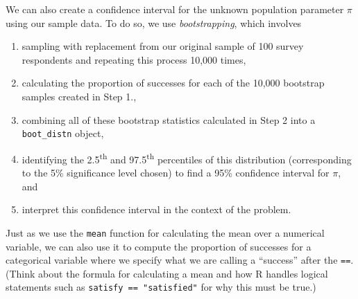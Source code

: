 \documentclass[12pt,]{krantz}
\makeatletter
\newenvironment{Shaded}{\begin{snugshade}}{\end{snugshade}}
\newcommand{\KeywordTok}[1]{\textcolor[rgb]{0.27,0.27,0.27}{\textbf{#1}}}
\newcommand{\DataTypeTok}[1]{\textcolor[rgb]{0.27,0.27,0.27}{#1}}
\newcommand{\DecValTok}[1]{\textcolor[rgb]{0.06,0.06,0.06}{#1}}
\newcommand{\StringTok}[1]{\textcolor[rgb]{0.5,0.5,0.5}{#1}}
\newcommand{\OperatorTok}[1]{\textcolor[rgb]{0.43,0.43,0.43}{\textbf{#1}}}
\newcommand{\NormalTok}[1]{#1}
\providecommand{\tightlist}{%
  \setlength{\itemsep}{0pt}\setlength{\parskip}{0pt}}
\newenvironment{kframe}{%
\medskip{}
\setlength{\fboxsep}{.8em}
 \def\at@end@of@kframe{}%
 \ifinner\ifhmode%
  \def\at@end@of@kframe{\end{minipage}}%
  \begin{minipage}{\columnwidth}%
 \fi\fi%
 \def\FrameCommand##1{\hskip\@totalleftmargin \hskip-\fboxsep
 \colorbox{shadecolor}{##1}\hskip-\fboxsep
     \hskip-\linewidth \hskip-\@totalleftmargin \hskip\columnwidth}%
 \MakeFramed {\advance\hsize-\width
   \@totalleftmargin\z@ \linewidth\hsize
   \@setminipage}}%
 {\par\unskip\endMakeFramed%
 \at@end@of@kframe}
\renewenvironment{Shaded}{\begin{kframe}}{\end{kframe}}
\makeatother
\begin{document}
We can also create a confidence interval for the unknown population
parameter \(\pi\) using our sample data. To do so, we use
\emph{bootstrapping}, which involves

\begin{enumerate}
\def\labelenumi{\arabic{enumi}.}
\tightlist
\item
  sampling with replacement from our original sample of 100 survey
  respondents and repeating this process 10,000 times,
\item
  calculating the proportion of successes for each of the 10,000
  bootstrap samples created in Step 1.,
\item
  combining all of these bootstrap statistics calculated in Step 2 into
  a \texttt{boot\_distn} object,
\item
  identifying the 2.5\textsuperscript{th} and 97.5\textsuperscript{th}
  percentiles of this distribution (corresponding to the 5\%
  significance level chosen) to find a 95\% confidence interval for
  \(\pi\), and
\item
  interpret this confidence interval in the context of the problem.
\end{enumerate}

\begin{Shaded}
\end{Shaded}

Just as we use the \texttt{mean} function for calculating the mean over
a numerical variable, we can also use it to compute the proportion of
successes for a categorical variable where we specify what we are
calling a ``success'' after the \texttt{==}. (Think about the formula
for calculating a mean and how R handles logical statements such as
\texttt{satisfy\ ==\ "satisfied"} for why this must be true.)

\begin{Shaded}
\end{Shaded}
\end{document}

